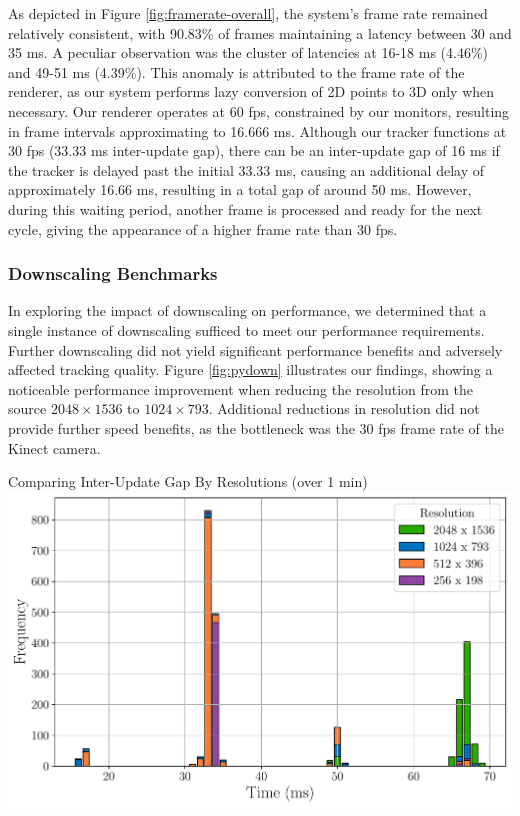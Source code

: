 As depicted in Figure \ref{fig:framerate-overall}, the system's frame rate remained relatively consistent, with 90.83\% of frames maintaining a latency between 30 and 35 ms. A peculiar observation was the cluster of latencies at 16-18 ms (4.46\%) and 49-51 ms (4.39\%). This anomaly is attributed to the frame rate of the renderer, as our system performs lazy conversion of 2D points to 3D only when necessary. Our renderer operates at 60 fps, constrained by our monitors, resulting in frame intervals approximating to 16.666 ms. Although our tracker functions at 30 fps (33.33 ms inter-update gap), there can be an inter-update gap of 16 ms if the tracker is delayed past the initial 33.33 ms, causing an additional delay of approximately 16.66 ms, resulting in a total gap of around 50 ms. However, during this waiting period, another frame is processed and ready for the next cycle, giving the appearance of a higher frame rate than 30 fps.

\subsubsection{Downscaling Benchmarks}

In exploring the impact of downscaling on performance, we determined that a single instance of downscaling sufficed to meet our performance requirements. Further downscaling did not yield significant performance benefits and adversely affected tracking quality. Figure \ref{fig:pydown} illustrates our findings, showing a noticeable performance improvement when reducing the resolution from the source $2048 \times 1536$ to $1024 \times 793$. Additional reductions in resolution did not provide further speed benefits, as the bottleneck was the 30 fps frame rate of the Kinect camera.

\begin{figureBox}[label={fig:pydown}, width=1.0\linewidth]{Comparing Inter-Update Gap By Resolutions (over 1 min)}
    \includegraphics[width = 1.0\linewidth]{./evaluation/figures/pydown.pdf}
\end{figureBox}

